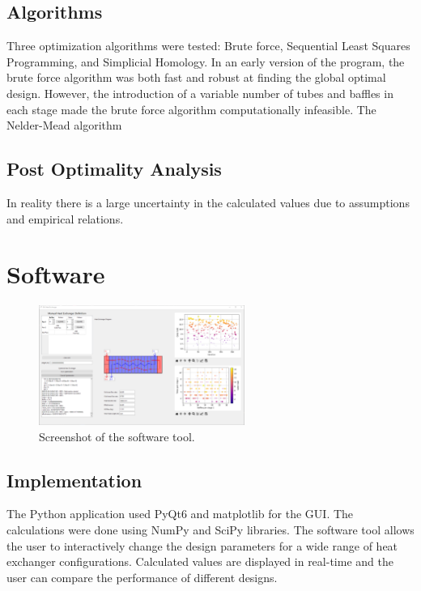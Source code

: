 \documentclass{article}
\begin{document}
\subsection{Algorithms}
Three optimization algorithms were tested: Brute force, Sequential Least Squares Programming, and Simplicial Homology.
In an early version of the program, the brute force algorithm was both fast and robust at finding the global optimal design.
However, the introduction of a variable number of tubes and baffles in each stage made the brute force algorithm computationally infeasible.
The Nelder-Mead algorithm

\subsection{Post Optimality Analysis}

In reality there is a large uncertainty in the calculated values due to assumptions and empirical relations.


\section{Software}

\begin{figure}[H]
    \centering
    \includegraphics[width=0.6\textwidth]{software.png}
    \caption{Screenshot of the software tool.}
    \label{fig:software}
\end{figure}

\subsection{Implementation}

The Python application used PyQt6 and matplotlib for the GUI. The calculations were done using NumPy and SciPy libraries.
The software tool allows the user to interactively change the design parameters for a wide range of heat exchanger configurations.
Calculated values are displayed in real-time and the user can compare the performance of different designs.
\end{document}
